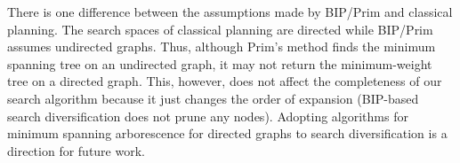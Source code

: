 There is one difference between the assumptions made by BIP/Prim \cite{barabasi1996invasion} and classical planning.
The search spaces of classical planning are directed while BIP/Prim assumes undirected graphs. Thus, although Prim's method finds the minimum spanning tree on an undirected graph, it may not return the minimum-weight tree on a directed graph. This, however, does not affect the completeness of our search algorithm because it just changes the order of expansion (BIP-based search diversification does not prune any nodes).
% 
% 
Adopting algorithms for minimum spanning arborescence for directed graphs \cite{chu1965shortest,edmonds1967optimum,tarjan1977finding,gabow1986efficient} to search diversification is a direction for future work.%

